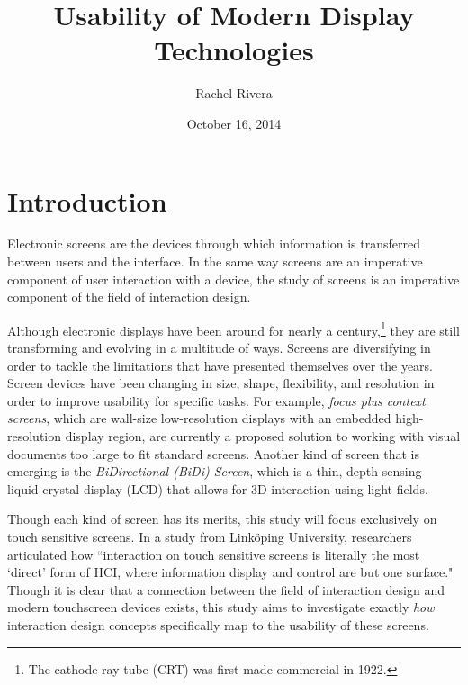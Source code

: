 \documentclass{article}
\title{Usability of Modern Display Technologies}
\author{Rachel Rivera}
\date{October 16, 2014}
\begin{document}
\maketitle


\pagebreak
\tableofcontents


\pagebreak

%
%
\section{Introduction}
\label{introduction}

Electronic screens are the devices through which information is transferred between users and the interface. In the same way screens are an imperative component of user interaction with a device, the study of screens is an imperative component of the field of interaction design.

Although electronic displays have been around for nearly a century,\footnote{The cathode ray tube (CRT) was first made commercial in 1922.\cite{Cathode}} they are still transforming and evolving in a multitude of ways. Screens are diversifying in order to tackle the limitations that have presented themselves over the years. Screen devices have been changing in size, shape, flexibility, and resolution in order to improve usability for specific tasks. For example, \textit{focus plus context screens}, which are wall-size low-resolution displays with an embedded high-resolution display region, are currently a proposed solution to working with visual documents too large to fit standard screens.\cite{Baudisch} Another kind of screen that is emerging is the \textit{BiDirectional (BiDi) Screen}, which is a thin, depth-sensing liquid-crystal display (LCD) that allows for 3D interaction using light fields.\cite{Hirsch}

 Though each kind of screen has its merits, this study will focus exclusively on touch sensitive screens. In a study from Link\"{o}ping University, researchers articulated how ``interaction on touch sensitive screens is literally the most `direct' form of HCI, where information display and control are but one surface."\cite{Albinsson} Though it is clear that a connection between the field of interaction design and modern touchscreen devices exists, this study aims to investigate exactly \textit{how} interaction design concepts specifically map to the usability of these screens. 
\end{document}
